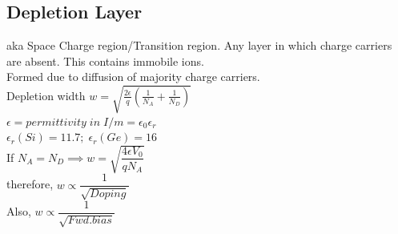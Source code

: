 \documentclass[10pt, a4paper]{report}
\begin{document}
	\subsection{Depletion Layer}
	aka Space Charge region/Transition region. Any layer in which charge carriers are absent. This contains immobile ions. \\
	Formed due to diffusion of majority charge carriers.\\
	Depletion width $ w = \sqrt{\frac{2\epsilon}{q}(\frac{1}{N_A} + \frac{1}{N_D})} $ \\
	$ \epsilon = permittivity\; in \; I/m  = \epsilon_0 \epsilon_r$\\
	$\epsilon_r(Si) = 11.7;\; \epsilon_r(Ge) =16$\\
	If $ N_A = N_D  \implies w = \sqrt{\dfrac{4\epsilon V_0}{qN_A}}$\\
	therefore, $ w \propto\dfrac{1}{\sqrt{Doping}} $\\
	Also, $ w \propto \dfrac{1}{\sqrt{Fwd.bias}} $
	
\end{document}
